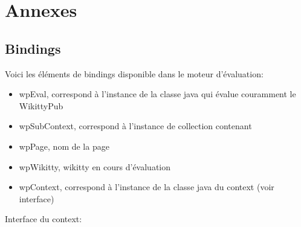 \section{Annexes}

\subsection*{Bindings}

Voici les éléments de bindings disponible dans le moteur d'évaluation:
	
\begin{itemize}
\item wpEval, correspond à l'instance de la classe java qui évalue couramment le WikittyPub
\item wpSubContext, correspond à l'instance de collection contenant 
\item wpPage, nom de la page 
\item wpWikitty, wikitty en cours d'évaluation
\item wpContext, correspond à l'instance de la classe java du context (voir interface)
\end{itemize}

Interface du context:


